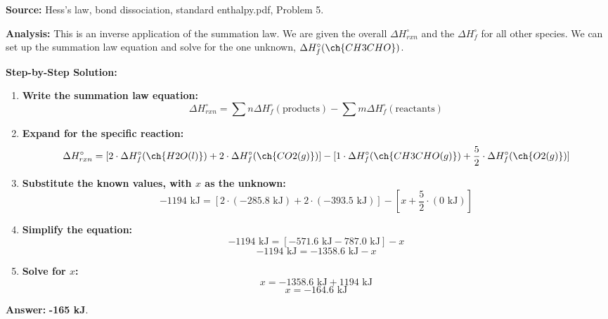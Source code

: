 \documentclass{article}
\begin{document}
\textbf{Source:} Hess's law, bond dissociation, standard enthalpy.pdf, Problem 5.

\textbf{Analysis:} This is an inverse application of the summation law. We are given the overall $\Delta H_{rxn}^\circ$ and the $\Delta H_f^\circ$ for all other species. We can set up the summation law equation and solve for the one unknown, $\Delta H_f^\circ(\ch{CH3CHO})$.

\textbf{Step-by-Step Solution:}
\begin{enumerate}
    \item \textbf{Write the summation law equation:}
    \[ \Delta H_{rxn}^\circ = \sum n\Delta H_f^\circ(\text{products}) - \sum m\Delta H_f^\circ(\text{reactants}) \]
    \item \textbf{Expand for the specific reaction:}
    \[ \Delta H_{rxn}^\circ = [2 \cdot \Delta H_f^\circ(\ch{H2O(l)}) + 2 \cdot \Delta H_f^\circ(\ch{CO2(g)})] - [1 \cdot \Delta H_f^\circ(\ch{CH3CHO(g)}) + \frac{5}{2} \cdot \Delta H_f^\circ(\ch{O2(g)})] \]
    \item \textbf{Substitute the known values, with $x$ as the unknown:}
    \[ -1194 \text{ kJ} = [2 \cdot (-285.8 \text{ kJ}) + 2 \cdot (-393.5 \text{ kJ})] - [x + \frac{5}{2} \cdot (0 \text{ kJ})] \]
    \item \textbf{Simplify the equation:}
    \[ -1194 \text{ kJ} = [-571.6 \text{ kJ} - 787.0 \text{ kJ}] - x \]
    \[ -1194 \text{ kJ} = -1358.6 \text{ kJ} - x \]
    \item \textbf{Solve for $x$:}
    \[ x = -1358.6 \text{ kJ} + 1194 \text{ kJ} \]
    \[ x = -164.6 \text{ kJ} \]
\end{enumerate}

\textbf{Answer:} \textbf{-165 kJ}.
\end{document}
